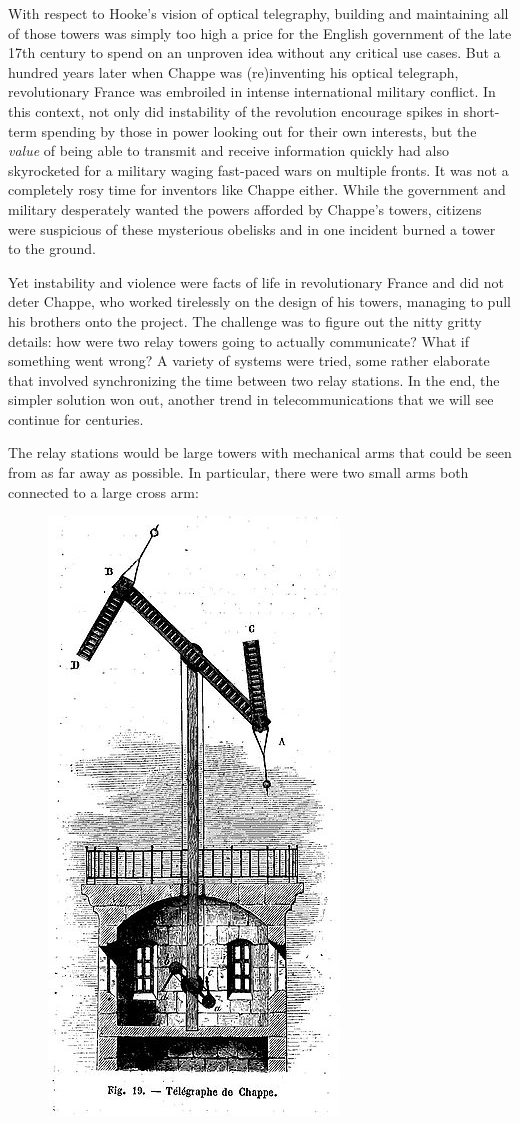 \documentclass[UTF8]{book}
\begin{document}
\begin{CJK}{UTF8}{gbsn}
With respect to Hooke's vision of optical telegraphy, building and maintaining all of those towers was simply too high a price for the English government of the late 17th century to spend on an unproven idea without any critical use cases. But a hundred years later when Chappe was (re)inventing his optical telegraph, revolutionary France was embroiled in intense international military conflict. In this context, not only did instability of the revolution encourage spikes in short-term spending by those in power looking out for their own interests, but the \emph{value} of being able to transmit and receive information quickly had also skyrocketed for a military waging fast-paced wars on multiple fronts. It was not a completely rosy time for inventors like Chappe either. While the government and military desperately wanted the powers afforded by Chappe's towers, citizens were suspicious of these mysterious obelisks and in one incident burned a tower to the ground.

Yet instability and violence were facts of life in revolutionary France and did not deter Chappe, who worked tirelessly on the design of his towers, managing to pull his brothers onto the project. The challenge was to figure out the nitty gritty details: how were two relay towers going to actually communicate? What if something went wrong? A variety of systems were tried, some rather elaborate that involved synchronizing the time between two relay stations. In the end, the simpler solution won out, another trend in telecommunications that we will see continue for centuries.

The relay stations would be large towers with mechanical arms that could be seen from as far away as possible. In particular, there were two small arms both connected to a large cross arm:

\begin{figure}[H]
\centering
\includegraphics[width=0.3\linewidth]{chappe_tower}
\end{figure}


\end{CJK}
\end{document}
